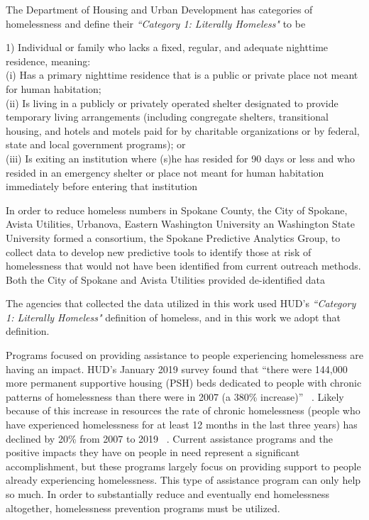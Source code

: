 \documentclass[10pt,letterpaper]{article}
\begin{document}
The Department of Housing and Urban Development has categories of homelessness and define their \textit{``Category 1: Literally Homeless"} to be
\begin{displayquote}
1) Individual or family who lacks a fixed, regular, and adequate nighttime residence, meaning: \\
(i) Has a primary nighttime residence that is a public or private place not meant for human habitation; \\
(ii) Is living in a publicly or privately operated shelter designated to provide temporary living arrangements (including congregate shelters, transitional housing, and hotels and motels paid for by charitable organizations or by federal, state and local government programs); or \\
(iii) Is exiting an institution where (s)he has resided for 90 days or less and who resided in an emergency shelter or place not meant for human habitation immediately before entering that institution
\end{displayquote}



In order to reduce homeless numbers in Spokane County, the City of Spokane, Avista Utilities, Urbanova, Eastern Washington University an Washington State University formed a consortium, the Spokane Predictive Analytics Group, to collect data to develop new predictive tools to identify those at risk of homelessness that would not have been identified from current outreach methods.  Both the City of Spokane and Avista Utilities provided de-identified data 


The agencies that collected the data utilized in this work used HUD's \textit{``Category 1: Literally Homeless"} definition of homeless, and in this work we adopt that definition.

Programs focused on providing assistance to people experiencing homelessness are having an impact. HUD's January 2019 survey found that ``there were 144,000 more permanent supportive housing (PSH) beds dedicated to people with chronic patterns of homelessness than there were in 2007 (a 380\% increase)'' ~\cite{2019AHAR}. Likely because of this increase in resources the rate of chronic homelessness (people who have experienced homelessness for at least 12 months in the last three years) has declined by 20\% from 2007 to 2019 ~\cite{2019AHAR}. Current assistance programs and the positive impacts they have on people in need represent a significant accomplishment, but these programs largely focus on providing support to people already experiencing homelessness. This type of assistance program can only help so much. In order to substantially reduce and eventually end homelessness altogether, homelessness prevention programs must be utilized. 
\end{document}
